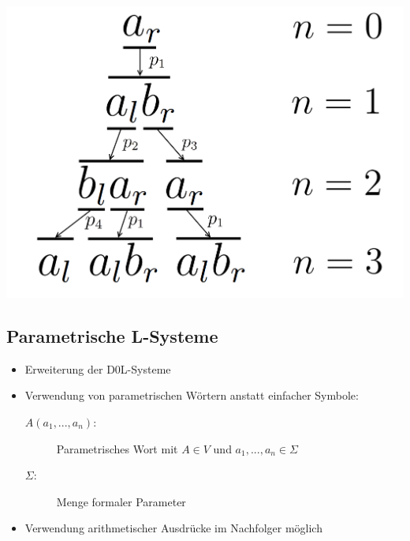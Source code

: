\newpage

\begin{center}
	\includegraphics[height=1\textheight]{images/CH2_AnabaenaAbleitung.png}
\end{center}





\newpage
{}
\subsection{Parametrische L-Systeme\\ }

\begin{itemize}
	\item Erweiterung der D0L-Systeme \\
	
	\item Verwendung von parametrischen Wörtern anstatt einfacher Symbole:
	\begin{description}
			\item[\boldmath$A(a_1, ..., a_n):$] Parametrisches Wort mit $A\in V$ und $a_1, ..., a_n \in \Sigma$\\
		
			\item[\boldmath$\Sigma:$] Menge formaler Parameter\\
	\end{description}
	
	\item Verwendung arithmetischer Ausdrücke im Nachfolger möglich
		

\end{itemize}




